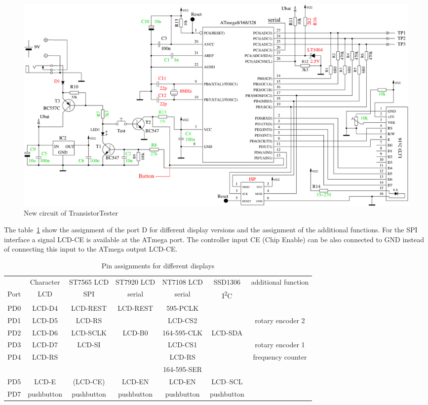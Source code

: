 \begin{figure}[H]
\centering
\includegraphics[width=1.\textwidth]{../FIG/ttester.pdf}
\caption{New circuit of TransistorTester}
\label{fig:ttester}
\end{figure}

The table~\ref{tab:display-con} show the assignment of the port D for different display versions
and the assignment of the additional functions.
For the SPI interface a signal LCD-CE is available at the ATmega port. The controller input CE (Chip Enable) can 
be also connected to GND instead of connecting this input to the ATmega output LCD-CE.

\begin{table}[H] \small
  \begin{center}
    \begin{tabular}{| c || c | c | c | c | c | c |}
    \hline
           & Character     & ST7565 LCD & ST7920 LCD     & NT7108 LCD  & SSD1306     & additional function \\
      Port & LCD           &   SPI      & serial         & serial      &   I\textsuperscript{2}C      & \\
    \hline
    \hline
    PD0    &  LCD-D4       &  LCD-REST  & LCD-REST       & 595-PCLK        &            & \\
    \hline
    PD1    &  LCD-D5       &  LCD-RS    &                & LCD-CS2     &             & rotary encoder 2 \\
    \hline
    PD2    &  LCD-D6       &  LCD-SCLK  & LCD-B0         & 164-595-CLK &  LCD-SDA    & \\
    \hline
    PD3    &  LCD-D7       &  LCD-SI    &                & LCD-CS1     &             & rotary encoder 1 \\
    \hline
    PD4    &  LCD-RS       &            &                & LCD-RS      &             & frequency counter \\
           &               &            &                & 164-595-SER &             &                \\
    \hline
    PD5    &  LCD-E        & (LCD-CE)   & LCD-EN         & LCD-EN      &   LCD--SCL  & \\
    \hline
    PD7    &  pushbutton   & pushbutton & pushbutton     & pushbutton  & pushbutton  & \\
    \hline
    \end{tabular}
  \end{center}
  \caption{Pin assignments for different displays}
  \label{tab:display-con}
\end{table}


